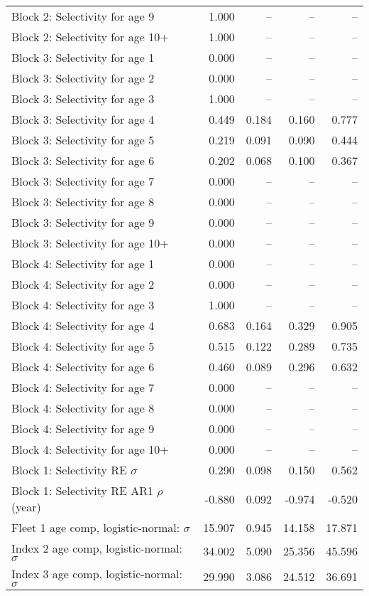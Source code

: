 \documentclass[
]{article}
\begin{document}
\begin{landscape}
\begin{longtable}[t]{lrrrr}
\addlinespace
Block 2: Selectivity for age 9 & 1.000 & -- & -- & --\\
Block 2: Selectivity for age 10+ & 1.000 & -- & -- & --\\
Block 3: Selectivity for age 1 & 0.000 & -- & -- & --\\
Block 3: Selectivity for age 2 & 0.000 & -- & -- & --\\
Block 3: Selectivity for age 3 & 1.000 & -- & -- & --\\
\addlinespace
Block 3: Selectivity for age 4 & 0.449 & 0.184 & 0.160 & 0.777\\
Block 3: Selectivity for age 5 & 0.219 & 0.091 & 0.090 & 0.444\\
Block 3: Selectivity for age 6 & 0.202 & 0.068 & 0.100 & 0.367\\
Block 3: Selectivity for age 7 & 0.000 & -- & -- & --\\
Block 3: Selectivity for age 8 & 0.000 & -- & -- & --\\
\addlinespace
Block 3: Selectivity for age 9 & 0.000 & -- & -- & --\\
Block 3: Selectivity for age 10+ & 0.000 & -- & -- & --\\
Block 4: Selectivity for age 1 & 0.000 & -- & -- & --\\
Block 4: Selectivity for age 2 & 0.000 & -- & -- & --\\
Block 4: Selectivity for age 3 & 1.000 & -- & -- & --\\
\addlinespace
Block 4: Selectivity for age 4 & 0.683 & 0.164 & 0.329 & 0.905\\
Block 4: Selectivity for age 5 & 0.515 & 0.122 & 0.289 & 0.735\\
Block 4: Selectivity for age 6 & 0.460 & 0.089 & 0.296 & 0.632\\
Block 4: Selectivity for age 7 & 0.000 & -- & -- & --\\
Block 4: Selectivity for age 8 & 0.000 & -- & -- & --\\
\addlinespace
Block 4: Selectivity for age 9 & 0.000 & -- & -- & --\\
Block 4: Selectivity for age 10+ & 0.000 & -- & -- & --\\
Block 1: Selectivity RE $\sigma$ & 0.290 & 0.098 & 0.150 & 0.562\\
Block 1: Selectivity RE AR1 $\rho$ (year) & -0.880 & 0.092 & -0.974 & -0.520\\
Fleet 1 age comp, logistic-normal: $\sigma$ & 15.907 & 0.945 & 14.158 & 17.871\\
\addlinespace
Index 2 age comp, logistic-normal: $\sigma$ & 34.002 & 5.090 & 25.356 & 45.596\\
Index 3 age comp, logistic-normal: $\sigma$ & 29.990 & 3.086 & 24.512 & 36.691\\*
\end{longtable}
\end{landscape}
\end{document}
